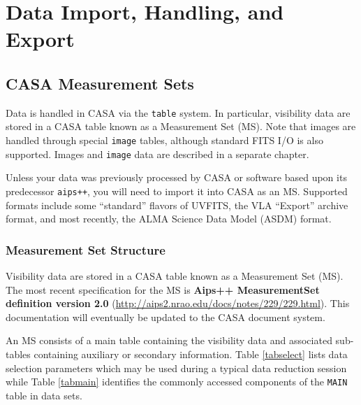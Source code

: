 

\chapter{Data Import, Handling, and Export}
\label{chapter:iotool} 

\section{CASA Measurement Sets}
\label{section:iotool.ms}

Data is handled in CASA via the {\tt table} system.  In particular,
visibility data are stored in a CASA table known as a Measurement Set
(MS).  Note that images are handled through special
{\tt image} tables, although standard FITS I/O is also supported.
Images and {\tt image} data are described in a separate chapter.

Unless your data was previously processed by CASA or software based
upon its predecessor {\tt aips++}, you will need to import it into
CASA as an MS.  Supported formats include some ``standard'' flavors
of UVFITS, the VLA ``Export'' archive format, and most recently,
the ALMA Science Data Model (ASDM) format.

\subsection{Measurement Set Structure}
\label{section:iotool.ms.struct}

Visibility data are stored in a CASA table known as a
Measurement Set (MS).  The most recent specification for the MS
is {\bf Aips++ MeasurementSet definition version 2.0}
(\url{http://aips2.nrao.edu/docs/notes/229/229.html}).
This documentation will eventually be updated to the CASA 
document system.

An MS consists of a main table containing the
visibility data and associated sub-tables containing auxiliary or
secondary information.  Table \ref{tabselect} lists data selection
parameters which may be used during a typical data reduction session
while Table \ref{tabmain} identifies the commonly accessed components
of the {\tt MAIN} table in data sets.

